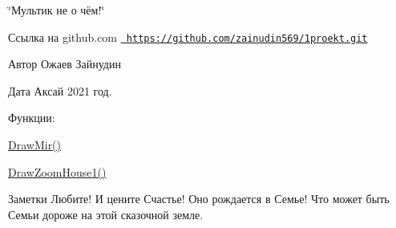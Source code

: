 \char`\"{}Мультик не о чём!\char`\"{}

\begin{DoxyParagraph}{Ссылка на github.com}
\href{https://github.com/zainudin569/1proekt.git}{\texttt{ https\+://github.\+com/zainudin569/1proekt.\+git}}
\end{DoxyParagraph}
\begin{DoxyAuthor}{Автор}
Ожаев Зайнудин 
\end{DoxyAuthor}
\begin{DoxyDate}{Дата}
Аксай 2021 год.
\end{DoxyDate}
\begin{DoxyParagraph}{Функции\+:}

\begin{DoxyItemize}
\item \mbox{\hyperlink{_ozhaev_01_zaynudin_01cartoon_8cpp_a6484c6b48dd41123c803b7825f72c4c4}{Draw\+Mir()}}  
\item \mbox{\hyperlink{_ozhaev_01_zaynudin_01cartoon_8cpp_a14dbbb9029429641d219e57cf2edd5c7}{Draw\+Zoom\+House1()}}  
\end{DoxyItemize}
\end{DoxyParagraph}
\begin{DoxyNote}{Заметки}
Любите! И цените Счастье! Оно рождается в Семье! Что может быть Семьи дороже на этой сказочной земле. 
\end{DoxyNote}

